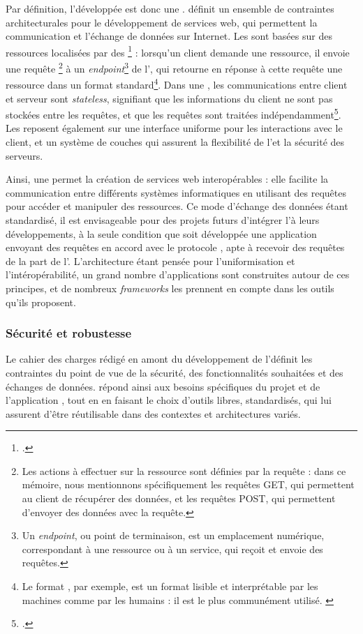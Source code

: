     Par définition, l'\api développée est donc une \api \rest. \rest définit un ensemble de contraintes architecturales pour le développement de services web, qui permettent la communication et l'échange de données sur Internet. Les \api \rest sont basées sur des ressources localisées par des \URL\footcite{APIRESTEst} : lorsqu'un client demande une ressource, il envoie une requête \http\footnote{Les actions à effectuer sur la ressource sont définies par la requête \http : dans ce mémoire, nous mentionnons spécifiquement les requêtes GET, qui permettent au client de récupérer des données, et les requêtes POST, qui permettent d'envoyer des données avec la requête.} à un \textit{endpoint}\footnote{Un \textit{endpoint}, ou point de terminaison, est un emplacement numérique, correspondant à une ressource ou à un service, qui reçoit et envoie des requêtes.} de l'\api, qui retourne en réponse à cette requête une ressource dans un format standard\footnote{Le format \json, par exemple, est un format lisible et interprétable par les machines comme par les humains : il est le plus communément utilisé. \cite{APIRESTEst}}. Dans une \api \rest, les communications entre client et serveur sont \textit{stateless}, signifiant que les informations du client ne sont pas stockées entre les requêtes, et que les requêtes sont traitées indépendamment\footcite{APIRESTEst}. Les \api \rest reposent également sur une interface uniforme pour les interactions avec le client, et un système de couches qui assurent la flexibilité de l'\api et la sécurité des serveurs.
    
    Ainsi, une \api \rest permet la création de services web interopérables : elle facilite la communication entre différents systèmes informatiques en utilisant des requêtes \http pour accéder et manipuler des ressources. Ce mode d'échange des données étant standardisé, il est envisageable pour des projets futurs d'intégrer l'\api à leurs développements, à la seule condition que soit développée une application envoyant des requêtes en accord avec le protocole \http, apte à recevoir des requêtes de la part de l'\api. L'architecture \rest étant pensée pour l'uniformisation et l'intéropérabilité, un grand nombre d'applications sont construites autour de ces principes, et de nombreux \textit{frameworks} les prennent en compte dans les outils qu'ils proposent.
        
    \subsubsection{Sécurité et robustesse}
    Le cahier des charges rédigé en amont du développement de l'\api définit les contraintes du point de vue de la sécurité, des fonctionnalités souhaitées et des échanges de données. \exapi répond ainsi aux besoins spécifiques du projet et de l'application \eida, tout en en faisant le choix d'outils libres, standardisés, qui lui assurent d'être réutilisable dans des contextes et architectures variés.
    
